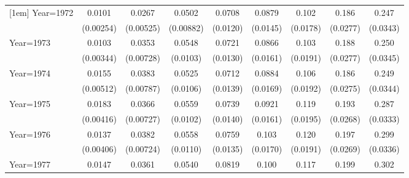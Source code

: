 \begin{table}[htbp]
\begin{tabular}{l*{8}{c}}
[1em]
Year=1972           &      0.0101\sym{***}&      0.0267\sym{***}&      0.0502\sym{***}&      0.0708\sym{***}&      0.0879\sym{***}&       0.102\sym{***}&       0.186\sym{***}&       0.247\sym{***}\\
                    &   (0.00254)         &   (0.00525)         &   (0.00882)         &    (0.0120)         &    (0.0145)         &    (0.0178)         &    (0.0277)         &    (0.0343)         \\
[1em]
Year=1973           &      0.0103\sym{***}&      0.0353\sym{***}&      0.0548\sym{***}&      0.0721\sym{***}&      0.0866\sym{***}&       0.103\sym{***}&       0.188\sym{***}&       0.250\sym{***}\\
                    &   (0.00344)         &   (0.00728)         &    (0.0103)         &    (0.0130)         &    (0.0161)         &    (0.0191)         &    (0.0277)         &    (0.0345)         \\
[1em]
Year=1974           &      0.0155\sym{***}&      0.0383\sym{***}&      0.0525\sym{***}&      0.0712\sym{***}&      0.0884\sym{***}&       0.106\sym{***}&       0.186\sym{***}&       0.249\sym{***}\\
                    &   (0.00512)         &   (0.00787)         &    (0.0106)         &    (0.0139)         &    (0.0169)         &    (0.0192)         &    (0.0275)         &    (0.0344)         \\
[1em]
Year=1975           &      0.0183\sym{***}&      0.0366\sym{***}&      0.0559\sym{***}&      0.0739\sym{***}&      0.0921\sym{***}&       0.119\sym{***}&       0.193\sym{***}&       0.287\sym{***}\\
                    &   (0.00416)         &   (0.00727)         &    (0.0102)         &    (0.0140)         &    (0.0161)         &    (0.0195)         &    (0.0268)         &    (0.0333)         \\
[1em]
Year=1976           &      0.0137\sym{***}&      0.0382\sym{***}&      0.0558\sym{***}&      0.0759\sym{***}&       0.103\sym{***}&       0.120\sym{***}&       0.197\sym{***}&       0.299\sym{***}\\
                    &   (0.00406)         &   (0.00724)         &    (0.0110)         &    (0.0135)         &    (0.0170)         &    (0.0191)         &    (0.0269)         &    (0.0336)         \\
[1em]
Year=1977           &      0.0147\sym{***}&      0.0361\sym{***}&      0.0540\sym{***}&      0.0819\sym{***}&       0.100\sym{***}&       0.117\sym{***}&       0.199\sym{***}&       0.302\sym{***}\\

\end{tabular}
\end{table}
